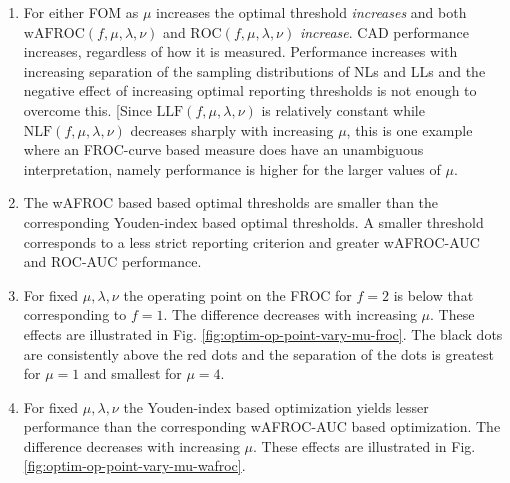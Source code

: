 \documentclass[
]{book}
\begin{document}
\begin{enumerate}
\def\labelenumi{\arabic{enumi}.}
\item
  For either FOM as \(\mu\) increases the optimal threshold \emph{increases} and both \(\text{wAFROC} \left ( f, \mu, \lambda, \nu \right )\) and \(\text{ROC} \left ( f, \mu, \lambda, \nu \right )\) \emph{increase}. CAD performance increases, regardless of how it is measured. Performance increases with increasing separation of the sampling distributions of NLs and LLs and the negative effect of increasing optimal reporting thresholds is not enough to overcome this. {[}Since \(\text{LLF} \left ( f, \mu, \lambda, \nu \right )\) is relatively constant while \(\text{NLF} \left ( f, \mu, \lambda, \nu \right )\) decreases sharply with increasing \(\mu\), this is one example where an FROC-curve based measure does have an unambiguous interpretation, namely performance is higher for the larger values of \(\mu\).
\item
  The wAFROC based based optimal thresholds are smaller than the corresponding Youden-index based optimal thresholds. A smaller threshold corresponds to a less strict reporting criterion and greater wAFROC-AUC and ROC-AUC performance.
\item
  For fixed \(\mu, \lambda, \nu\) the operating point on the FROC for \(f = 2\) is below that corresponding to \(f = 1\). The difference decreases with increasing \(\mu\). These effects are illustrated in Fig. \ref{fig:optim-op-point-vary-mu-froc}. The black dots are consistently above the red dots and the separation of the dots is greatest for \(\mu = 1\) and smallest for \(\mu = 4\).
\item
  For fixed \(\mu, \lambda, \nu\) the Youden-index based optimization yields lesser performance than the corresponding wAFROC-AUC based optimization. The difference decreases with increasing \(\mu\). These effects are illustrated in Fig. \ref{fig:optim-op-point-vary-mu-wafroc}.
\end{enumerate}
\end{document}

